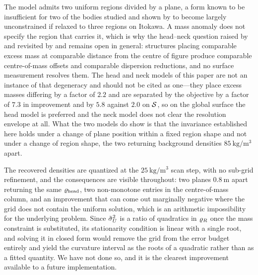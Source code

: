 The model admits two uniform regions divided by a plane, a form known to
be insufficient for two of the bodies studied and shown by
\citet{kanamaru2019pss} to become largely unconstrained if relaxed to
three regions on Itokawa. A mass anomaly does not specify the region that
carries it, which is why the head--neck question raised by
\citet{scheeres2008} and revisited by \citet{lowry2014} and
\citet{kanamaru2019pss} remains open in general: structures placing
comparable excess mass at comparable distance from the centre of figure
produce comparable centre-of-mass offsets and comparable dispersion
reductions, and no surface measurement resolves them. The head and neck
models of this paper are not an instance of that degeneracy and should not
be cited as one---they place excess masses differing by a factor of $2.2$
and are separated by the objective by a factor of $7.3$ in improvement and
by $5.8$ against $2.0$ on $\mathcal{S}$, so on the global surface the head
model is preferred and the neck model does not clear the resolution
envelope at all. What the two models do show is that the invariance
established here holds under a change of plane position within a fixed
region shape and not under a change of region shape, the two returning
background densities $\SI{85}{\kilo\gram\per\cubic\metre}$ apart.

The recovered densities are quantized at the
$\SI{25}{\kilo\gram\per\cubic\metre}$ scan step, with no sub-grid
refinement, and the consequences are visible throughout: two planes
$\SI{0.8}{\metre}$ apart returning the same $\varrho_{\mathrm{head}}$, two non-monotone
entries in the centre-of-mass column, and an improvement that can come out
marginally negative where the grid does not contain the uniform solution,
which is an arithmetic impossibility for the underlying problem. Since
$\tilde{\sigma}_{U}^{2}$ is a ratio of quadratics in $\varrho_{R}$ once the mass
constraint is substituted, its stationarity condition is linear with a
single root, and solving it in closed form would remove the grid from the
error budget entirely and yield the curvature interval as the roots of a
quadratic rather than as a fitted quantity. We have not done so, and it is
the clearest improvement available to a future implementation.

